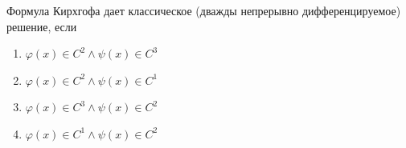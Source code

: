 Формула Кирхгофа дает классическое (дважды непрерывно дифференцируемое) решение, если

\begin{enumerate}[label=\arabic*)]
    \item \(\varphi (x)\in C^2\land \psi (x)\in C^3\)
    \item \(\varphi (x)\in C^2\land \psi (x)\in C^1\)
    \item \(\varphi (x)\in C^3\land \psi (x)\in C^2\)
    \item \(\varphi (x)\in C^1\land \psi (x)\in C^2\)
\end{enumerate}

